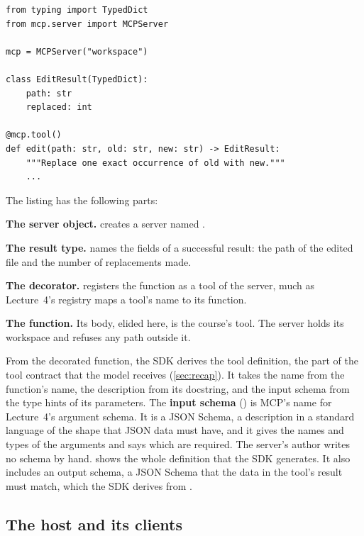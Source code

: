 \noindent\begin{minipage}{\linewidth}
\begin{lstlisting}[basicstyle=\ttfamily\footnotesize, caption={Illustrative code for the edit server, written with the official Python SDK.}, label=lst:mcp-server]
from typing import TypedDict
from mcp.server import MCPServer

mcp = MCPServer("workspace")

class EditResult(TypedDict):
    path: str
    replaced: int

@mcp.tool()
def edit(path: str, old: str, new: str) -> EditResult:
    """Replace one exact occurrence of old with new."""
    ...
\end{lstlisting}
\end{minipage}

The listing has the following parts:
\bi
\item \textbf{The server object.}  creates a server named
.
\item \textbf{The result type.}  names the fields of a successful result: the
path of the edited file and the number of replacements made.
\item \textbf{The decorator.}  registers the function as a tool of the server,
much as Lecture~4's registry maps a tool's name to its function.
\item \textbf{The function.} Its body, elided here, is the course's  tool. The server
holds its workspace and refuses any path outside it.
\ei

From the decorated function, the SDK derives the tool definition, the part of the tool contract that
the model receives (\cref{sec:recap}). It takes the name from the function's name, the description from its
docstring, and the input schema from the type hints of its parameters. The \textbf{input schema} () is MCP's name for Lecture~4's argument
schema. It is a JSON Schema, a description in a standard language of the shape that JSON data must
have, and it gives the names and types of the arguments and says which are required. The server's
author writes no schema by hand.  shows the whole definition that the SDK
generates. It also includes an output schema, a JSON Schema that the data in the tool's result must
match, which the SDK derives from .

\subsection{The host and its clients}
\label{sec:mcp-host}

